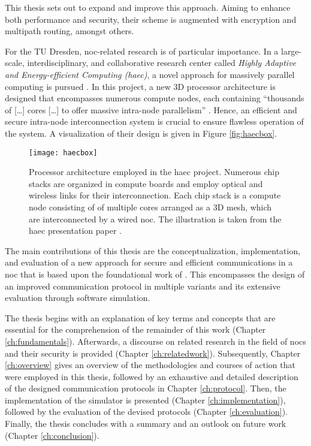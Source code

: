 This thesis sets out to expand and improve this approach. Aiming to enhance both performance and security, their scheme is augmented with
encryption and multipath routing, amongst others.

For the TU Dresden, \gls{noc}-related research is of particular importance. In a large-scale, interdisciplinary, and collaborative research center
called \textit{Highly Adaptive and Energy-efficient Computing (\gls{haec})}, a novel approach for massively parallel computing is pursued
\cite{matthiesen17haec}. In this project, a new 3D processor architecture is designed that encompasses numerous compute nodes, each containing
\enquote{thousands of […] cores […] to offer massive intra-node parallelism} \cite[1]{matthiesen17haec}. Hence, an efficient and secure intra-node
interconnection system is crucial to ensure flawless operation of the system. A visualization of their design is given in Figure \vref{fig:haecbox}.

\begin{figure}
    \centering
    \texttt{[image: haecbox]}
    \caption[Processor architecture in the HAEC project]{Processor architecture employed in the \gls{haec} project. Numerous chip stacks are organized
    in compute boards and employ optical and wireless links for their interconnection. Each chip stack is a compute node consisting of of multiple
    cores arranged as a 3D mesh, which are interconnected by a wired \gls{noc}. The illustration is taken from the \gls{haec} presentation paper
    \cite[1]{matthiesen17haec}.}
    \label{fig:haecbox}
\end{figure}

The main contributions of this thesis are the conceptualization, implementation, and evaluation of a new approach for secure and efficient
communications in a \gls{noc} that is based upon the foundational work of \citeauthor{moriam18activeattackers}
\cites{moriam15manycorenc}{moriam18activeattackers}. This encompasses the design of an improved communication protocol in multiple variants and its
extensive evaluation through software simulation.

The thesis begins with an explanation of key terms and concepts that are essential for the comprehension of the remainder of this work (Chapter
\ref{ch:fundamentals}). Afterwards, a discourse on related research in the field of \glspl{noc} and their security is provided (Chapter
\ref{ch:relatedwork}). Subsequently, Chapter \ref{ch:overview} gives an overview of the methodologies and courses of action that were employed in this
thesis, followed by an exhaustive and detailed description of the designed communication protocols in Chapter \ref{ch:protocol}. Then, the
implementation of the simulator is presented (Chapter \ref{ch:implementation}), followed by the evaluation of the devised protocols (Chapter
\ref{ch:evaluation}). Finally, the thesis concludes with a summary and an outlook on future work (Chapter \ref{ch:conclusion}).

